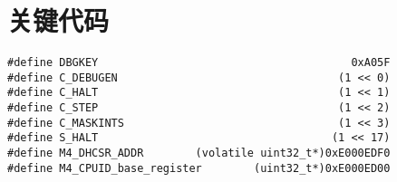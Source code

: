 \chapter{关键代码}\label{Code}
\vspace{0.5cm}

\begin{lstlisting}
#define DBGKEY                                       0xA05F
#define C_DEBUGEN                                  (1 << 0)
#define C_HALT                                     (1 << 1)
#define C_STEP                                     (1 << 2)
#define C_MASKINTS                                 (1 << 3)
#define S_HALT                                    (1 << 17)
#define M4_DHCSR_ADDR        (volatile uint32_t*)0xE000EDF0
#define M4_CPUID_base_register        (uint32_t*)0xE000ED00
\end{lstlisting}
